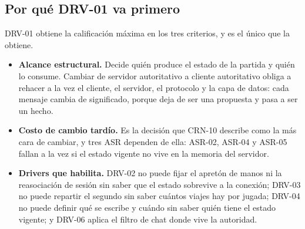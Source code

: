 \subsection{Por qué DRV-01 va primero}

DRV-01 obtiene la calificación máxima en los tres criterios, y es el único que la obtiene.

\begin{itemize}
  \item \textbf{Alcance estructural.} Decide quién produce el estado de la partida y quién lo consume. Cambiar de servidor autoritativo a cliente autoritativo obliga a rehacer a la vez el cliente, el servidor, el protocolo y la capa de datos: cada mensaje cambia de significado, porque deja de ser una propuesta y pasa a ser un hecho.
  \item \textbf{Costo de cambio tardío.} Es la decisión que CRN-10 describe como la más cara de cambiar, y tres ASR dependen de ella: ASR-02, ASR-04 y ASR-05 fallan a la vez si el estado vigente no vive en la memoria del servidor.
  \item \textbf{Drivers que habilita.} DRV-02 no puede fijar el apretón de manos ni la reasociación de sesión sin saber que el estado sobrevive a la conexión; DRV-03 no puede repartir el segundo sin saber cuántos viajes hay por jugada; DRV-04 no puede definir qué se escribe y cuándo sin saber quién tiene el estado vigente; y DRV-06 aplica el filtro de chat donde vive la autoridad.
\end{itemize}
